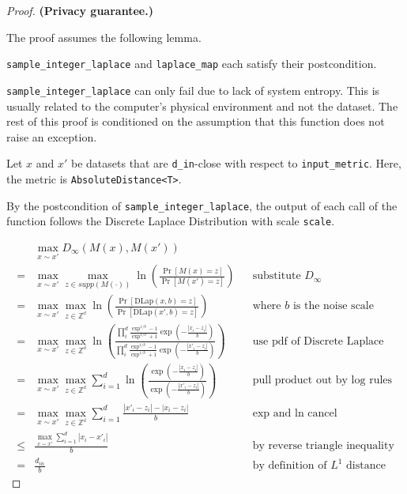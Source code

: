 \documentclass{article}
\begin{document}
\begin{proof} 
\textbf{(Privacy guarantee.)} 
    
\begin{tcolorbox}
    The proof assumes the following lemma.
    \begin{lemma}
        \texttt{sample\_integer\_laplace} and \texttt{laplace\_map} each satisfy their postcondition.
    \end{lemma}
\end{tcolorbox}

\texttt{sample\_integer\_laplace} can only fail due to lack of system entropy. 
This is usually related to the computer's physical environment and not the dataset. 
The rest of this proof is conditioned on the assumption that this function does not raise an exception. 

Let $x$ and $x'$ be datasets that are \texttt{d\_in}-close with respect to \texttt{input\_metric}.
Here, the metric is \texttt{AbsoluteDistance<T>}.

By the postcondition of \texttt{sample\_integer\_laplace},
the output of each call of the function follows the Discrete Laplace Distribution with scale \texttt{scale}.

\begin{align*}
    & \max_{x \sim x'} D_{\infty}(M(x), M(x'))  \\
    =& \max_{x \sim x'} \max_{z \in supp(M(\cdot))} \ln\left(\frac{\Pr\left[M(x) = z\right]}{\Pr\left[M(x') = z \right]}\right)
        &&\text{substitute } D_{\infty}\\
    =& \max_{x \sim x'} \max_{z \in \mathbb{Z^d}} \ln\left(\frac{\Pr\left[\mathrm{DLap}(x, b) = z \right]}{\Pr\left[\mathrm{DLap}(x', b) = z\right]}\right)
        &&\text{where } b \text{ is the noise scale} \\
    =& \max_{x \sim x'} \max_{z \in \mathbb{Z^d}} \ln\left(\frac{
        \prod_i^d \frac{\exp^{1/b} - 1}{\exp^{1/b} + 1} \exp \left( -\frac{|x_i - z_i|}{b} \right)
    }{
        \prod_i^d \frac{\exp^{1/b} - 1}{\exp^{1/b} + 1} \exp \left( -\frac{|x'_i - z_i|}{b} \right)
    }\right) 
        &&\text{use pdf of Discrete Laplace} \\
    =& \max_{x \sim x'} \max_{z \in \mathbb{Z^d}} \sum_{i=1}^d \ln\left(\frac{
    \exp \left( -\frac{|x_i - z_i|}{b} \right)
    }{
        \exp \left( -\frac{|x'_i - z_i|}{b} \right)
    }\right) &&\text{pull product out by log rules}\\
    =& \max_{x \sim x'} \max_{z \in \mathbb{Z^d}} \sum_{i=1}^d \frac{|x'_i - z_i| - |x_i - z_i|}{b}&& \text{exp and ln cancel} \\
    \leq& \frac{\max_{x \sim x'} \sum_{i=1}^d |x_i - x'_i|}{b} &&\text{by reverse triangle inequality} \\
    =& \frac{d_{in}}{b}  &&\text{by definition of } L^1 \text{ distance}
\end{align*}


\end{proof}
\end{document}
